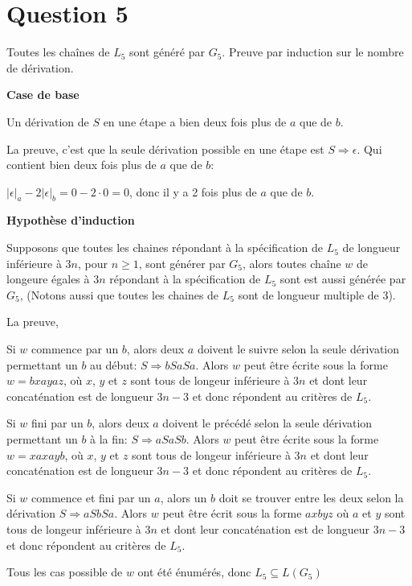 \documentclass[class=article]{standalone}
\begin{document}
\section*{Question 5}

Toutes les chaînes de $L_5$ sont généré par $G_5$. Preuve par induction sur le nombre de dérivation.

{\bf Case de base}

Un dérivation de $S$ en une étape a bien deux fois plus de $a$ que de $b$. 

La preuve, c'est que la seule dérivation possible en une 
étape est $S \Rightarrow \epsilon$. Qui contient bien deux fois 
plus de $a$ que de $b$: 

$|\epsilon|_a - 2|\epsilon|_b = 0 - 2\cdot0 = 0$,
donc il y a 2 fois plus de $a$ que de $b$.

{\bf Hypothèse d'induction}

Supposons que toutes les chaines répondant à la spécification de $L_5$
de longueur inférieure à $3n$, pour $n \geq 1$, sont générer par $G_5$,
alors toutes chaîne $w$ de longeure égales à $3n$ répondant à la spécification de $L_5$
sont est aussi générée par $G_5$, 
(Notons aussi que toutes les chaines de $L_5$ 
sont de longueur multiple de 3). 

La preuve, 

Si $w$ commence par un $b$, alors deux $a$ doivent 
le suivre selon la seule dérivation permettant un $b$ au début: $S \Rightarrow bSaSa$.
Alors $w$ peut être écrite sous la forme 
$w = bxayaz$, où $x$, $y$ et $z$ 
sont tous de longeur inférieure à $3n$ et dont leur concaténation
est de longueur $3n-3$ 
et donc répondent au critères de $L_5$.


Si $w$ fini par un $b$, alors deux $a$ doivent 
le précédé selon la seule dérivation permettant un $b$ à la fin: $S \Rightarrow aSaSb$.
Alors $w$ peut être écrite sous la forme 
$w = xaxayb$, où $x$, $y$ et $z$
sont tous de longeur inférieure à $3n$ et dont leur concaténation
est de longueur $3n-3$ et donc répondent au critères de $L_5$.

Si $w$ commence et fini par un $a$, alors un $b$ doit se trouver entre
les deux selon la dérivation $S \Rightarrow aSbSa$.
Alors $w$ peut être écrit sous la forme
$axbyz$ où $a$ et $y$
sont tous de longeur inférieure à $3n$ et dont leur concaténation
est de longueur $3n-3$ et donc répondent au critères de $L_5$.

Tous les cas possible de $w$ ont été énumérés, donc $L_5 \subseteq L(G_5)$
\end{document}
